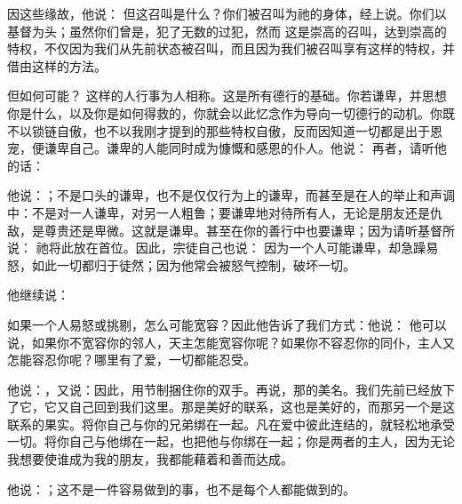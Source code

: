 因这些缘故，他说： 但这召叫是什么？你们被召叫为祂的身体，经上说。你们以基督为头；虽然你们曾是，犯了无数的过犯，然而 这是崇高的召叫，达到崇高的特权，不仅因为我们从先前状态被召叫，而且因为我们被召叫享有这样的特权，并借由这样的方法。\par

但如何可能？ 这样的人行事为人相称。这是所有德行的基础。你若谦卑，并思想你是什么，以及你是如何得救的，你就会以此忆念作为导向一切德行的动机。你既不以锁链自傲，也不以我刚才提到的那些特权自傲，反而因知道一切都是出于恩宠，便谦卑自己。谦卑的人能同时成为慷慨和感恩的仆人。他说： 再者，请听他的话：\par

他说：；不是口头的谦卑，也不是仅仅行为上的谦卑，而甚至是在人的举止和声调中：不是对一人谦卑，对另一人粗鲁；要谦卑地对待所有人，无论是朋友还是仇敌，是尊贵还是卑微。这就是谦卑。甚至在你的善行中也要谦卑；因为请听基督所说： 祂将此放在首位。因此，宗徒自己也说： 因为一个人可能谦卑，却急躁易怒，如此一切都归于徒然；因为他常会被怒气控制，破坏一切。\par

他继续说：\par

如果一个人易怒或挑剔，怎么可能宽容？因此他告诉了我们方式：他说： 他可以说，如果你不宽容你的邻人，天主怎能宽容你呢？如果你不容忍你的同仆，主人又怎能容忍你呢？哪里有了爱，一切都能忍受。\par

他说：，又说：因此，用节制捆住你的双手。再说，那的美名。我们先前已经放下了它，它又自己回到我们这里。那是美好的联系，这也是美好的，而那另一个是这联系的果实。将你自己与你的兄弟绑在一起。凡在爱中彼此连结的，就轻松地承受一切。将你自己与他绑在一起，也把他与你绑在一起；你是两者的主人，因为无论我想要使谁成为我的朋友，我都能藉着和善而达成。\par

他说：；这不是一件容易做到的事，也不是每个人都能做到的。\par

